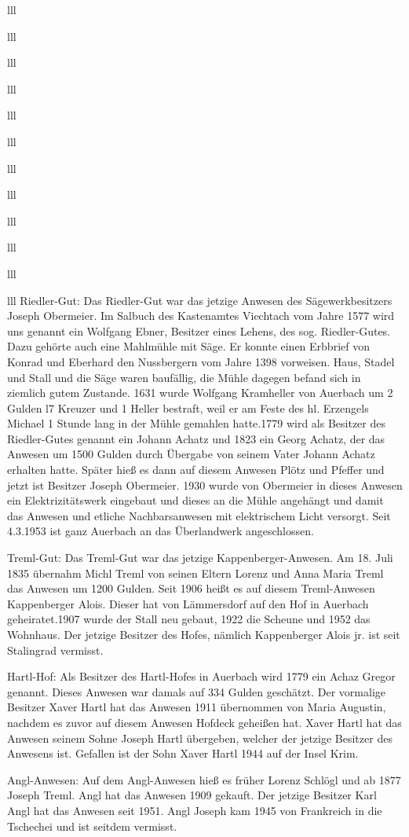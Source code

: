 \documentclass[12pt,a4pager]{book}
\begin{document}
\begin{tabuluar}{lll}
\begin{tabuluar}{lll}
\begin{tabuluar}{lll}
\begin{tabuluar}{lll}
\begin{tabuluar}{lll}
\begin{tabuluar}{lll}
\begin{tabuluar}{lll}
\begin{tabuluar}{lll}
\begin{tabuluar}{lll}
\begin{tabuluar}{lll}
\begin{tabuluar}{lll}
\begin{tabuluar}{lll}
Riedler-Gut: Das Riedler-Gut war das jetzige Anwesen des Sägewerkbesitzers
Joseph Obermeier. Im Salbuch des Kastenamtes Viechtach vom Jahre 1577 wird uns
genannt ein Wolfgang Ebner, Besitzer eines Lehens, des sog. Riedler-Gutes. Dazu
gehörte auch eine Mahlmühle mit Säge. Er konnte einen Erbbrief von Konrad und
Eberhard den Nussbergern vom Jahre 1398 vorweisen. Haus, Stadel und Stall und
die Säge waren baufällig, die Mühle dagegen befand sich in ziemlich gutem
Zustande. 1631 wurde Wolfgang Kramheller von Auerbach um 2 Gulden l7 Kreuzer und
1 Heller bestraft, weil er am Feste des hl. Erzengels Michael 1 Stunde lang in
der Mühle gemahlen hatte.1779 wird als Besitzer des Riedler-Gutes genannt ein
Johann Achatz und 1823 ein Georg Achatz, der das Anwesen um 1500 Gulden durch
Übergabe von seinem Vater Johann Achatz erhalten hatte. Später hieß es dann auf
diesem Anwesen Plötz und Pfeffer und jetzt ist Besitzer Joseph Obermeier. 1930
wurde von Obermeier in dieses Anwesen ein Elektrizitätswerk eingebaut und dieses
an die Mühle angehängt und damit das Anwesen und etliche Nachbarsanwesen mit
elektrischem Licht versorgt. Seit 4.3.1953 ist ganz Auerbach an das Überlandwerk
angeschlossen.

Treml-Gut: Das Treml-Gut war das jetzige Kappenberger-Anwesen. Am 18. Juli 1835
übernahm Michl Treml von seinen Eltern Lorenz und Anna Maria Treml das Anwesen
um 1200 Gulden. Seit 1906 heißt es auf diesem Treml-Anwesen Kappenberger Alois.
Dieser hat von Lämmersdorf auf den Hof in Auerbach geheiratet.1907 wurde der
Stall neu gebaut, 1922 die Scheune und 1952 das Wohnhaus. Der jetzige Besitzer
des Hofes, nämlich Kappenberger Alois jr. ist seit Stalingrad vermisst.

Hartl-Hof: Als Besitzer des Hartl-Hofes in Auerbach wird 1779 ein Achaz Gregor
genannt. Dieses Anwesen war damals auf 334 Gulden geschätzt. Der vormalige
Besitzer Xaver Hartl hat das Anwesen 1911 übernommen von Maria Augustin, nachdem
es zuvor auf diesem Anwesen Hofdeck geheißen hat. Xaver Hartl hat das Anwesen
seinem Sohne Joseph Hartl übergeben, welcher der jetzige Besitzer des Anwesens
ist. Gefallen ist der Sohn Xaver Hartl 1944 auf der Insel Krim.

Angl-Anwesen: Auf dem Angl-Anwesen hieß es früher Lorenz Schlögl und ab 1877
Joseph Treml. Angl hat das Anwesen 1909 gekauft. Der jetzige Besitzer Karl Angl
hat das Anwesen seit 1951. Angl Joseph kam 1945 von Frankreich in die Tschechei
und ist seitdem vermisst.


\end{tabuluar}
\end{tabuluar}
\end{tabuluar}
\end{tabuluar}
\end{tabuluar}
\end{tabuluar}
\end{tabuluar}
\end{tabuluar}
\end{tabuluar}
\end{tabuluar}
\end{tabuluar}
\end{tabuluar}
\end{document}
